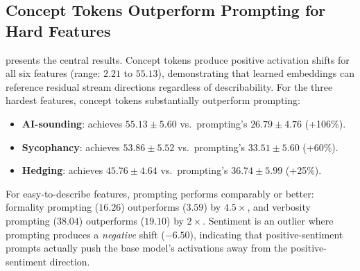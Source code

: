 \subsection{Concept Tokens Outperform Prompting for Hard Features}
\label{sec:main_results}

 presents the central results. Concept tokens produce positive activation shifts for all six features (range: $2.21$ to $55.13$), demonstrating that learned embeddings can reference residual stream directions regardless of describability. For the three hardest features, concept tokens substantially outperform prompting:

\begin{itemize}[leftmargin=*,itemsep=1pt,topsep=2pt]
    \item \textbf{AI-sounding}: \ct achieves $55.13 \pm 5.60$ vs.\ prompting's $26.79 \pm 4.76$ (+106\%).
    \item \textbf{Sycophancy}: \ct achieves $53.86 \pm 5.52$ vs.\ prompting's $33.51 \pm 5.60$ (+60\%).
    \item \textbf{Hedging}: \ct achieves $45.76 \pm 4.64$ vs.\ prompting's $36.74 \pm 5.99$ (+25\%).
\end{itemize}

For easy-to-describe features, prompting performs comparably or better: formality prompting ($16.26$) outperforms \ct ($3.59$) by $4.5\times$, and verbosity prompting ($38.04$) outperforms \ct ($19.10$) by $2\times$. Sentiment is an outlier where prompting produces a \emph{negative} shift ($-6.50$), indicating that positive-sentiment prompts actually push the base model's activations away from the positive-sentiment direction.

